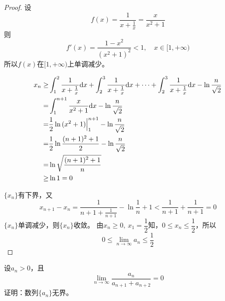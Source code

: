 \begin{proof}

    设
    $$f(x) = \dfrac{1}{x + \frac{1}{x}} = \dfrac{x}{x^2 + 1}$$
    则
    $$f'(x) = \dfrac{1 - x^2}{(x^2 + 1)^2} < 1,\quad x \in [1, +\infty)$$
    所以$f(x)$在$[1, +\infty)$上单调减少。

    \begin{align*}
        x_n \geq & \int_{1}^{2}{\dfrac{1}{x + \frac{1}{x}}}\mathrm{d} x + \int_{2}^{3}{\dfrac{1}{x + \frac{1}{x}}}\mathrm{d} x + \cdots + \int_{2}^{3}{\dfrac{1}{x + \frac{1}{x}}}\mathrm{d} x - \ln{\dfrac{n}{\sqrt{2}}} \\
        = & \int_{1}^{n + 1}{\dfrac{x}{x^2 + 1}}\mathrm{d} x - \ln{\dfrac{n}{\sqrt{2}}} \\
        = & \dfrac{1}{2} \ln{(x^2 + 1)} \Big|_{1}^{n + 1} - \ln{\dfrac{n}{\sqrt{2}}} \\
        = & \dfrac{1}{2} \ln{\dfrac{(n + 1)^2 + 1}{2}} - \ln{\dfrac{n}{\sqrt{2}}} \\
        = & \ln{\sqrt{\dfrac{(n + 1)^2 + 1}{n}}} \\
        \geq & \ln1 = 0 
    \end{align*}

    $\{x_n\}$有下界，又
    $$x_{n + 1} - x_n = \dfrac{1}{n + 1 + \frac{1}{n + 1}} - \ln{\dfrac{1}{n} + 1} < \dfrac{1}{n + 1} + \dfrac{1}{n + 1} = 0$$
    $\{x_n\}$单调减少，则$\{x_n\}$收敛。
    由$x_n \geq 0,\ x_1 = \dfrac{1}{2} $知，$0 \leq x_n \leq \dfrac{1}{2}$，所以
    $$0 \leq \lim\limits_{n \to \infty}{a_n} \leq \dfrac{1}{2}$$

\end{proof}

\begin{proposition}

    设$a_n > 0$，且
    $$\lim\limits_{n \to \infty}{\dfrac{a_n}{a_{n + 1} + a_{n + 2}}} = 0$$
    证明：数列$\{a_n\}$无界。
    
\end{proposition}

